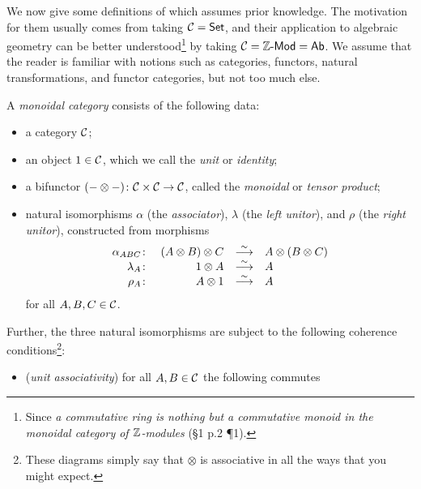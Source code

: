         We now give some definitions of which \cite{Toen:2005wxa} assumes prior knowledge.
        The motivation for them usually comes from taking $\mathcal{C}=\mathsf{Set}$, and their application to algebraic geometry can be better understood\footnote{
            Since \emph{\elide a commutative ring is nothing but a commutative monoid in the monoidal category of $\mathbb{Z}$-modules \elide} (\S1 p.2 \P1).
        } by taking $\mathcal{C}={{\mathbb{Z}}\hbox{-}\mathsf{Mod}}=\mathsf{Ab}$.
        We assume that the reader is familiar with notions such as categories, functors, natural transformations, and functor categories, but not too much else.

        \begin{definition}\label{df:monoidal-category}
            A \emph{monoidal category} consists of the following data:
            \begin{itemize}
                \item a category $\mathcal{C}$;
                \item an object $1\in\mathcal{C}$, which we call the \emph{unit} or \emph{identity};
                \item a bifunctor $({-}\otimes{-})\colon\mathcal{C}\times\mathcal{C}\to\mathcal{C}$, called the \emph{monoidal} or \emph{tensor product};
                \item natural isomorphisms $\alpha$ (the \emph{associator}), $\lambda$ (the \emph{left unitor}), and $\rho$ (the \emph{right unitor}), constructed from morphisms
                \begin{equation*}
                    \begin{array}{rrcl}
                        \alpha_{ABC}\colon & (A\otimes B)\otimes C & \overset{\sim}{\longrightarrow} & A\otimes(B\otimes C)\\
                        \lambda_A\colon & 1\otimes A & \overset{\sim}{\longrightarrow} & A\\
                        \rho_A\colon & A\otimes1 & \overset{\sim}{\longrightarrow} & A
                    \end{array}
                \end{equation*}
                for all $A,B,C\in\mathcal{C}$.
            \end{itemize}
            Further, the three natural isomorphisms are subject to the following coherence conditions\footnote{
                These diagrams simply say that $\otimes$ is associative in all the ways that you might expect.
            }:
            \begin{itemize}
                \item (\emph{unit associativity}) for all $A,B\in\mathcal{C}$ the following commutes

\end{itemize}
\end{definition}
